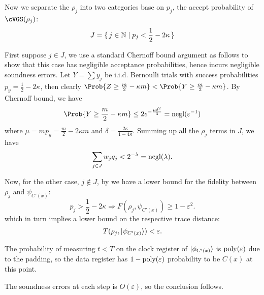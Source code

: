 \begin{prf}

	Now we separate the $\rho_j$ into two categories base on $p_j$, the accept probability of $\cVGS(\rho_j)$: 
	$$J=\set{j\in\mathbb{N}|p_j<\frac{1}{2}-2\kappa}$$
	

	First suppose $j\in J$, we use a standard Chernoff bound argument as follows to show that this case has negligible acceptance probabilities,
	hence incurs negligible soundness errors.
	Let $Y=\sum y_j$ be i.i.d. Bernoulli trials with success probabilities $p_y=\frac{1}{2}-2\kappa$,
	then clearly $\Prob{Z\geq\frac{m}{2}-\kappa m}<\Prob{Y\geq\frac{m}{2}-\kappa m}$.
	By Chernoff bound, we have
	$$\Prob{Y\geq\frac{m}{2}-\kappa m}\leq2e^{-\frac{\mu\delta^2}{3}}=\negl(\varepsilon^{-1})$$
	where $\mu=mp_y=\frac{m}{2}-2\kappa m$ and $\delta=\frac{2\kappa}{1-4\kappa}$.
	Summing up all the $\rho_j$ terms in $J$, we have
	$$\sum_{j\in J} w_j q_j<2^{-\lambda}=\operatorname{negl}(\lambda).$$

    
	Now, for the other case, $j\notin J$, by  we have a lower bound for the fidelity between $\rho_j$ and $\psi_{C'(x)}$:
	$$p_j>\frac{1}{2}-2\kappa\Rightarrow F(\rho_j, \psi_{C'(x)})\geq1-\varepsilon^2.$$
	which in turn implies a lower bound on the respective trace distance:
	$$T(\rho_j, \ket{\psi_{C'(x)}})<\varepsilon.$$

	The probability of measuring $t<T$ on the clock register of $\ket{\phi_{C'(x)}}$ is $\operatorname*{\operatorname{poly}}(\varepsilon)$ due to the padding,
	so the data register has $1-\operatorname*{\operatorname{poly}}(\varepsilon)$ probability to be $C(x)$ at this point. 

	The soundness errors at each step is $O(\varepsilon)$, so the conclusion follows.
\end{prf}
